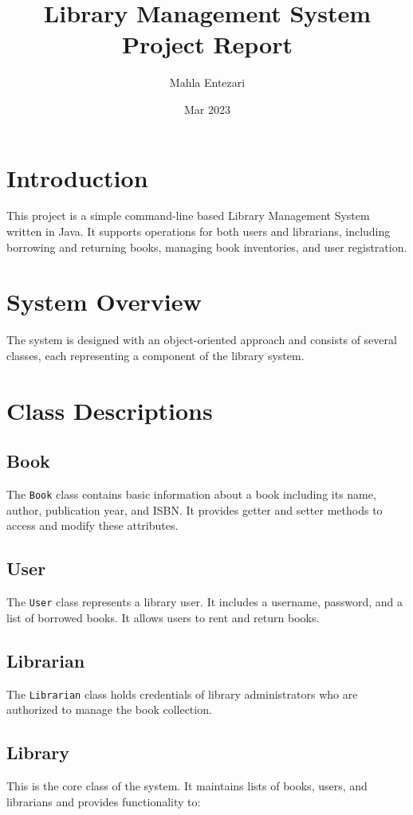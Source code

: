 \documentclass[a4paper,12pt]{article}
\title{Library Management System Project Report}
\author{Mahla Entezari}
\date{Mar 2023}
\begin{document}
\maketitle

\tableofcontents
\newpage

\section{Introduction}
This project is a simple command-line based Library Management System written in Java. It supports operations for both users and librarians, including borrowing and returning books, managing book inventories, and user registration.

\section{System Overview}
The system is designed with an object-oriented approach and consists of several classes, each representing a component of the library system.

\section{Class Descriptions}

\subsection{Book}
The \texttt{Book} class contains basic information about a book including its name, author, publication year, and ISBN. It provides getter and setter methods to access and modify these attributes.

\subsection{User}
The \texttt{User} class represents a library user. It includes a username, password, and a list of borrowed books. It allows users to rent and return books.

\subsection{Librarian}
The \texttt{Librarian} class holds credentials of library administrators who are authorized to manage the book collection.

\subsection{Library}
This is the core class of the system. It maintains lists of books, users, and librarians and provides functionality to:
\end{document}
